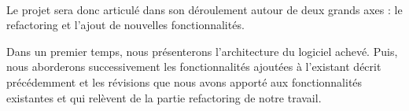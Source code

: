 \paragraph{}
Le projet sera donc articulé dans son déroulement autour de deux
grands axes : le refactoring et l'ajout de nouvelles
fonctionnalités.


Dans un premier temps, nous présenterons l'architecture du logiciel
achevé. Puis, nous aborderons successivement les fonctionnalités
ajoutées à l'existant décrit précédemment et les révisions que nous
avons apporté aux fonctionnalités existantes et qui relèvent de la
partie refactoring de notre travail.
